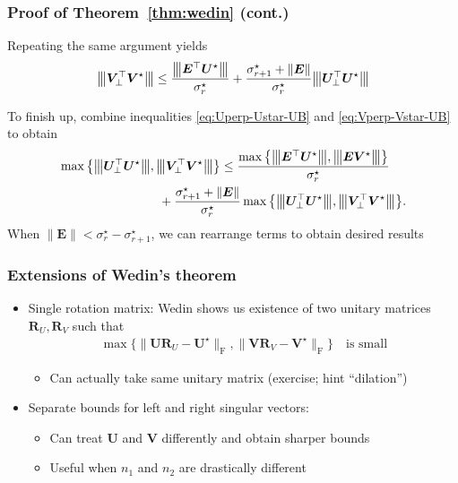 \documentclass[compress,
mathserif,wide,%
]{beamer}
\begin{document}
\begin{frame}
	\frametitle{Proof of Theorem~\ref{thm:wedin} (cont.)}
	
	Repeating the same argument yields
%
\begin{align}
{\big\vert\kern-0.25ex\big\vert\kern-0.25ex\big\vert \bm{V}_{\perp}^{\top}\bm{V}^{\star} \big\vert\kern-0.25ex\big\vert\kern-0.25ex\big\vert}\leq\frac{{\big\vert\kern-0.25ex\big\vert\kern-0.25ex\big\vert \bm{E}^{\top}\bm{U}^{\star} \big\vert\kern-0.25ex\big\vert\kern-0.25ex\big\vert}}{\sigma_{r}^{\star}}
	+\frac{\sigma_{r+1}^{\star}+\|\bm{E}\|}{\sigma_{r}^{\star}}{\big\vert\kern-0.25ex\big\vert\kern-0.25ex\big\vert \bm{U}_{\perp}^{\top}\bm{U}^{\star} \big\vert\kern-0.25ex\big\vert\kern-0.25ex\big\vert}
	\label{eq:Vperp-Vstar-UB}
\end{align}


To finish up, combine inequalities \eqref{eq:Uperp-Ustar-UB} and \eqref{eq:Vperp-Vstar-UB} to obtain
%
\begin{align*}
 & \max\big\{ \vertiiibig{\bm{U}_{\perp}^{\top}\bm{U}^{\star}},\vertiiibig{\bm{V}_{\perp}^{\top}\bm{V}^{\star}}\big\}
  \leq \frac{  \max\big\{  \vertiiibig{\bm{E}^{\top}\bm{U}^{\star}},\vertiiibig{\bm{E}\bm{V}^{\star}}  \big\} }{\sigma_r^{\star}}  \\
	&	\qquad\qquad\qquad\qquad
	+ \frac{\sigma_{r+1}^{\star}+\|\bm{E}\|}{\sigma_{r}^{\star}} \max\big\{ \vertiiibig{\bm{U}_{\perp}^{\top}\bm{U}^{\star}},\vertiiibig{\bm{V}_{\perp}^{\top}\bm{V}^{\star}}\big\} .
\end{align*}
%
When $\|\bm{E}\|<\sigma_r^{\star} - \sigma_{r+1}^{\star}$, we can rearrange terms to obtain desired results 
\end{frame}

\begin{frame}
	\frametitle{Extensions of Wedin's theorem}
	\begin{itemize}
		\item Single rotation matrix: Wedin shows us existence of two unitary matrices $\bm{R}_{U}, \bm{R}_{V}$ such that 
		\begin{align*}
	\max\big\{ \|\bm{U}\bm{R}_{U}-\bm{U}^{\star}\|_{\mathrm{F}}, \|\bm{V}\bm{R}_{V}-\bm{V}^{\star}\|_{\mathrm{F}} \big\} \quad \text{is small}
\end{align*}

	\begin{itemize}
		\item Can actually take same unitary matrix (exercise; hint ``dilation'')
	\end{itemize}
	
		\vfill
		\item Separate bounds for left and right singular vectors: 
		\begin{itemize}
		\item Can treat $\bm{U}$ and $\bm{V}$ differently and obtain sharper bounds
		\item Useful when $n_1$ and $n_2$ are drastically different
	\end{itemize}
	\end{itemize}
\end{frame}
\end{document}
